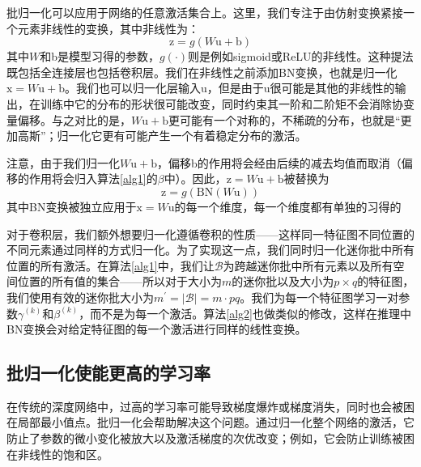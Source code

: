 \documentclass[../main.tex]{subfile}
\begin{document}
批归一化可以应用于网络的任意激活集合上。这里，我们专注于由仿射变换紧接一个元素非线性的变换，其中非线性为：
\begin{equation*}
    \text{z} = g\left( W\text{u} + \text{b} \right)
\end{equation*}
其中$W$和b是模型习得的参数，$g\left(\cdot\right)$则是例如sigmoid或ReLU的非线性。这种提法既包括全连接层也包括卷积层。我们在非线性之前添加BN变换，也就是归一化$\text{x} = W\text{u} + \text{b}$。我们也可以归一化层输入u，但是由于u很可能是其他的非线性的输出，在训练中它的分布的形状很可能改变，同时约束其一阶和二阶矩不会消除协变量偏移。与之对比的是，$W\text{u} + \text{b}$更可能有一个对称的，不稀疏的分布，也就是“更加高斯”；归一化它更有可能产生一个有着稳定分布的激活。

注意，由于我们归一化$W\text{u} + \text{b}$，偏移b的作用将会经由后续的减去均值而取消（偏移的作用将会归入算法\ref{alg1}的$\beta$中）。因此，$\text{z} = W\text{u} + \text{b}$被替换为
\begin{equation*}
    \text{z} = g\left(\text{BN}\left(W\text{u}\right)\right)
\end{equation*}
其中BN变换被独立应用于$\text{x} = W\text{u}$的每一个维度，每一个维度都有单独的习得的

对于卷积层，我们额外想要归一化遵循卷积的性质——这样同一特征图不同位置的不同元素通过同样的方式归一化。为了实现这一点，我们同时归一化迷你批中所有位置的所有激活。在算法\ref{alg1}中，我们让$\mathcal{B}$为跨越迷你批中所有元素以及所有空间位置的所有值的集合——所以对于大小为$m$的迷你批以及大小为$p\times q$的特征图，我们使用有效的迷你批大小为$m^\prime = \vert \mathcal{B} \vert = m\cdot pq $。我们为每一个特征图学习一对参数$\gamma^{\left(k\right)}$和$\beta^{\left(k\right)}$，而不是为每一个激活。算法\ref{alg2}也做类似的修改，这样在推理中BN变换会对给定特征图的每一个激活进行同样的线性变换。

\subsection{批归一化使能更高的学习率}

在传统的深度网络中，过高的学习率可能导致梯度爆炸或梯度消失，同时也会被困在局部最小值点。批归一化会帮助解决这个问题。通过归一化整个网络的激活，它防止了参数的微小变化被放大以及激活梯度的次优改变；例如，它会防止训练被困在非线性的饱和区。
\end{document}
